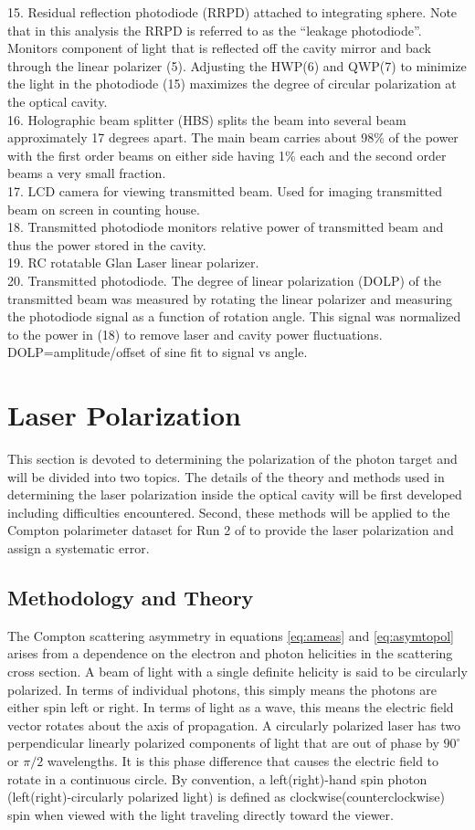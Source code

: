 {{15. Residual reflection photodiode (RRPD) attached to integrating sphere. Note that in this analysis the RRPD is referred to as the ``leakage photodiode''. Monitors component of light that is reflected off the cavity mirror and back through the linear polarizer (5). Adjusting the HWP(6) and QWP(7) to minimize the light in the photodiode (15) maximizes the degree of circular polarization at the optical cavity.\\
16. Holographic beam splitter (HBS) splits the beam into several beam approximately 17 degrees apart. The main beam carries about 98\% of the power with the first order beams on either side having 1\% each and the second order beams a very small fraction.\\
17. LCD camera for viewing transmitted beam. Used for imaging transmitted beam on screen in counting house.\\
18. Transmitted photodiode monitors relative power of transmitted beam and thus the power stored in the cavity.\\
19. RC rotatable Glan Laser linear polarizer.\\
20. Transmitted photodiode. The degree of linear polarization (DOLP) of the transmitted beam was measured by rotating the linear polarizer and measuring the photodiode signal as a function of rotation angle. This signal was normalized to the power in (18) to remove laser and cavity power fluctuations. DOLP=amplitude/offset of sine fit to signal vs angle.\\}
}
\section{Laser Polarization}
This section is devoted to determining the polarization of the photon target and will be divided into two topics. The details of the theory and methods used in determining the laser polarization inside the optical cavity will be first developed including difficulties encountered. Second, these methods will be applied to the Compton polarimeter dataset for Run 2 of \Qs to provide the laser polarization and assign a systematic error.
\subsection{\label{Sctn:Methodology}Methodology and Theory} 
The Compton scattering asymmetry in equations \ref{eq:ameas} and \ref{eq:asymtopol} arises from a dependence on the electron and photon helicities in the scattering cross section. A beam of light with a single definite helicity is said to be circularly polarized. In terms of individual photons, this simply means the photons are either spin left or right. In terms of light as a wave, this means the electric field vector rotates about the axis of propagation. A circularly polarized laser has two perpendicular linearly polarized components of light that are out of phase by $90^{\circ}$ or $\pi/2$ wavelengths. It is this phase difference that causes the electric field to rotate in a continuous circle. By convention, a left(right)-hand spin photon (left(right)-circularly polarized light) is defined as clockwise(counterclockwise) spin when viewed with the light traveling directly toward the viewer.

